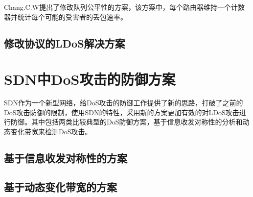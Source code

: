 Chang.C.W\cite{b8}提出了修改队列公平性的方案，该方案中，每个路由器维持一个计数器并统计每个可能的受害者的丢包速率。


\subsection{修改协议的LDoS解决方案}
\label{chap2:promodify}

\section{SDN中DoS攻击的防御方案}
SDN作为一个新型网络，给DoS攻击的防御工作提供了新的思路，打破了之前的DoS攻击防御的限制，使用SDN的特性，采用新的方案更加有效的对LDoS攻击进行防御。其中包括两类比较典型的DoS防御方案，基于信息收发对称性的分析和动态变化带宽来检测DoS攻击。

\subsection{基于信息收发对称性的方案}
\label{chap2:srbalance}


\subsection{基于动态变化带宽的方案}
\label{chap2:dynamicbandwidth}
